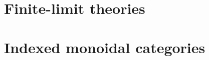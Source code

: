 \section{Finite-limit theories}
\label{sec:lex-theories}




\section{Indexed monoidal categories}
\label{sec:indexed-moncat}

